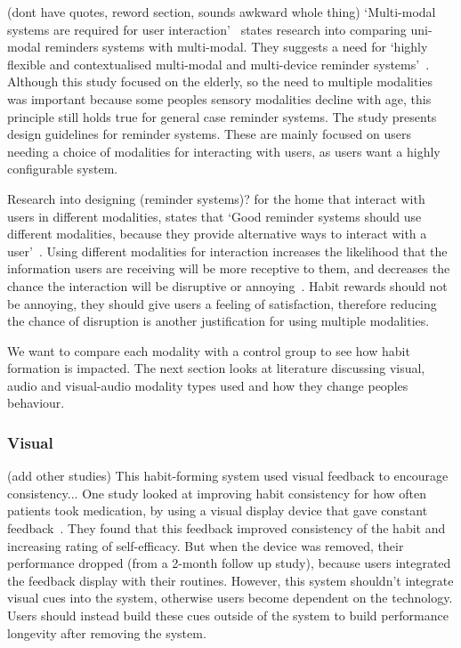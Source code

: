 \documentclass{scaffold/sigchi}
\begin{document}
(dont have quotes, reword section, sounds awkward whole thing) `Multi-modal systems are required for user interaction'~\cite{article_user_centred_multimodal_reminders} states research into comparing uni-modal reminders systems with multi-modal.
They suggests a need for `highly flexible and contextualised multi-modal and multi-device reminder systems'~\cite{article_user_centred_multimodal_reminders}.
Although this study focused on the elderly, so the need to multiple modalities was important because some peoples sensory modalities decline with age,
this principle still holds true for general case reminder systems. The study presents design guidelines for reminder systems.
These are mainly focused on users needing a choice of modalities for interacting with users, as users want a highly configurable system.

Research into designing (reminder systems)? for the home that interact with users in different modalities, states that
`Good reminder systems should use different modalities, because they provide alternative ways to interact with a user'~\cite{article_designing_multimodal_reminders_for_home}.
Using different modalities for interaction increases the likelihood that the information users are receiving will be more receptive to them,
and decreases the chance the interaction will be disruptive or annoying~\cite{article_designing_multimodal_reminders_for_home}.
Habit rewards should not be annoying, they should give users a feeling of satisfaction, therefore reducing the chance of disruption is another justification for using multiple modalities.

We want to compare each modality with a control group to see how habit formation is impacted. The next section looks at literature discussing visual, audio and visual-audio modality types used and how they change peoples behaviour.

\subsubsection{Visual}
(add other studies)
This habit-forming system used visual feedback to encourage consistency...
One study looked at improving habit consistency for how often patients took medication,
by using a visual display device that gave constant feedback~\cite{article_realtime_feedback_improving_medication_taking}.
They found that this feedback improved consistency of the habit and increasing rating of self-efficacy.
But when the device was removed, their performance dropped (from a 2-month follow up study), because users integrated the feedback display with their routines.
However, this system shouldn't integrate visual cues into the system, otherwise users become dependent on the technology.
Users should instead build these cues outside of the system to build performance longevity after removing the system.
\end{document}
